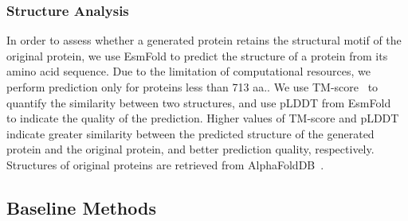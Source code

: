 \documentclass{article}
\begin{document}
\subsubsection{Structure Analysis}
In order to assess whether a generated protein retains the structural motif of the original protein, we use EsmFold to predict the structure of a protein from its amino acid sequence. Due to the limitation of computational resources, we perform prediction only for proteins less than 713 aa.. We use TM-score~\cite{zhang2005tmalign} to quantify the similarity between two structures, and use pLDDT from EsmFold~\cite{lin2023esmfold} to indicate the quality of the prediction. Higher values of TM-score and pLDDT indicate greater similarity between the predicted structure of the generated protein and the original protein, and better prediction quality, respectively. Structures of original proteins are retrieved from AlphaFoldDB~\cite{varadi2022alphafolddb}.



\subsection{Baseline Methods}
\end{document}
